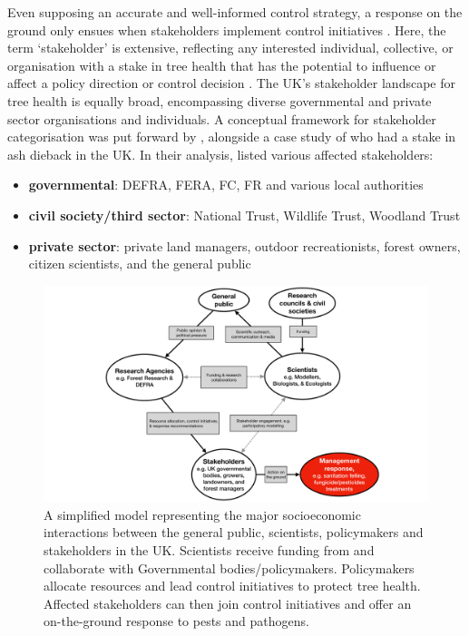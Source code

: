 Even supposing an accurate and well-informed control strategy,
a response on the ground only ensues when stakeholders implement control initiatives \cite{reed2018theory}. Here, the term `stakeholder' is extensive, reflecting any interested individual, collective, or organisation with a stake in tree health that has the potential to influence or affect a policy direction or control decision \cite{brugha2000stakeholder}. The UK's stakeholder landscape for tree health is equally broad, encompassing diverse governmental and private sector organisations and individuals. A conceptual framework for stakeholder categorisation was put forward by \cite{dandy2017has}, alongside a case study of who had a stake in ash dieback in the UK. In their analysis, \cite{dandy2017has} listed various affected stakeholders:
\begin{itemize}
    \item \textbf{governmental}: DEFRA, FERA, FC, FR and various local authorities
    \item \textbf{civil society/third sector}: National Trust, Wildlife Trust, Woodland Trust
    \item \textbf{private sector}: private land managers, outdoor recreationists, forest owners, citizen scientists, and the general public
\end{itemize}

\begin{figure}
    \centering
    \includegraphics[scale=0.35]{chapter1/figures/modelling-and-policy.pdf}
    \caption{A simplified model representing the major socioeconomic interactions between the general public, scientists, 
    policymakers and stakeholders in the UK. Scientists receive funding from and collaborate with Governmental bodies/policymakers. 
    Policymakers allocate resources and lead control initiatives to protect tree health. 
    Affected stakeholders can then join control initiatives and offer an on-the-ground response to pests and pathogens.}
    \label{fig:modelling-and-policies}
\end{figure}


